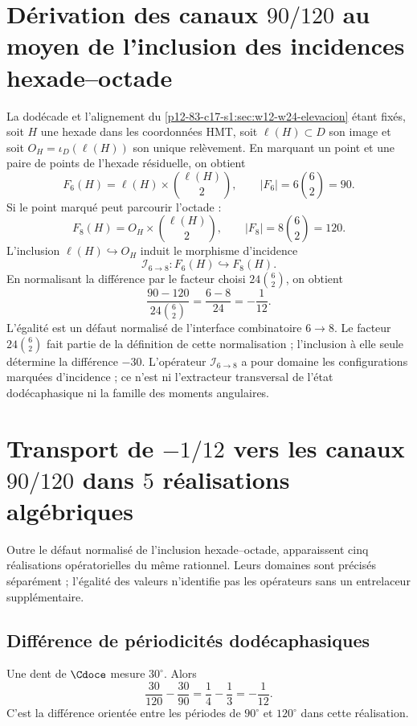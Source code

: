 \label{chap:83-14}

\section{Dérivation des canaux \(90/120\) au moyen de l'inclusion des incidences hexade--octade}

La dodécade et l’alignement du
\cref{p12-83-c17-s1:sec:w12-w24-elevacion} étant fixés, soit \(H\) une hexade dans les coordonnées HMT,
soit \(\ell(H)\subset D\) son image et soit
\(O_H=\iota_D(\ell(H))\) son unique relèvement. En marquant un point
et une paire de points de l’hexade résiduelle, on obtient
\[
F_6(H)=\ell(H)\times\binom{\ell(H)}2,
\qquad
|F_6|=6\binom62=90.
\]
Si le point marqué peut parcourir l’octade :
\[
F_8(H)=O_H\times\binom{\ell(H)}2,
\qquad
|F_8|=8\binom62=120.
\]
L’inclusion \(\ell(H)\hookrightarrow O_H\) induit le morphisme d’incidence
\[
 \mathcal I_{6\to8}:F_6(H)\hookrightarrow F_8(H).
\]
En normalisant la différence par le facteur
choisi \(24\binom62\), on obtient
\[
\boxed{
\frac{90-120}{24\binom62}
=\frac{6-8}{24}
=-\frac1{12}.}
\]
L’égalité est un défaut normalisé de l’interface combinatoire
\(6\to8\). Le facteur \(24\binom62\) fait partie de la définition de cette
normalisation ; l’inclusion à elle seule détermine la différence \(-30\).
L’opérateur \(\mathcal I_{6\to8}\) a pour domaine les configurations
marquées d’incidence ; ce n’est ni l’extracteur transversal de l’état
dodécaphasique ni la famille des moments angulaires.

\section{Transport de \(-1/12\) vers les canaux \(90/120\) dans \(5\) réalisations algébriques}

Outre le défaut normalisé de l’inclusion hexade--octade, apparaissent
cinq réalisations opératorielles du même rationnel. Leurs domaines sont
précisés séparément ; l’égalité des valeurs n’identifie pas les
opérateurs sans un entrelaceur supplémentaire.

\subsection{Différence de périodicités dodécaphasiques}

Une dent de \(\Cdoce\) mesure \(30^\circ\). Alors
\[
\frac{30}{120}-\frac{30}{90}
=\frac14-\frac13
=-\frac1{12}.
\]
C’est la différence orientée entre les périodes de \(90^\circ\) et
\(120^\circ\) dans cette réalisation.

